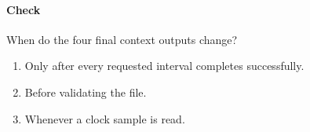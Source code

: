 
\clearpage

\paragraph{Check} When do the four final context outputs change?
\begin{enumerate}[label=\Alph*.]
  \item Only after every requested interval completes successfully.
  \item Before validating the file.
  \item Whenever a clock sample is read.
\end{enumerate}
